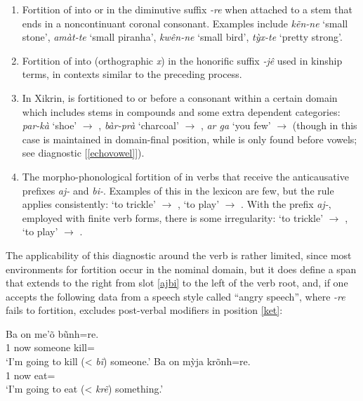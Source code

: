 \documentclass[output=paper]{langscibook}
\begin{document}
\begin{enumerate}
  \item\label{re} Fortition of  into  or  in the diminutive suffix {\em -re} when attached to a stem that ends in a noncontinuant coronal consonant. Examples include {\em kẽn-ne} `small stone', {\em amàt-te} `small piranha', {\em kwên-ne} `small bird', {\em tỳx-te} `pretty strong'. %
  \item\label{je} Fortition of  into  (orthographic {\em x}) in the honorific suffix {\em -jê} used in kinship terms, in contexts similar to the preceding process.
  \item In Xikrin,  is fortitioned to  or  before a consonant within a certain domain which includes stems in compounds and some extra dependent categories: {\em par-kà} `shoe' $\rightarrow$ \phofont{[patˈkʌ]}, {\em bàr-prà} `charcoal' $\rightarrow$ \phofont{[bʌtˈpɾʌ]}, {\em ar ga} `you few' $\rightarrow$ \phofont{[anˈga]} (though in this case \phofont{[an]} is maintained in domain-final position, while \phofont{[aɾ]} is only found before vowels; see diagnostic [\ref{echovowel}]).
  \item\label{bix} The morpho-phonological fortition of  in verbs that receive the anticausative prefixes {\em aj-} and {\em bi-}. Examples of this in the lexicon are few, but the rule applies consistently:  `to trickle' $\rightarrow$ \phofont{[bitʃaˈbjeɾe]},  `to play' $\rightarrow$ \phofont{[bitʃaˈeɾe]}. With the prefix {\em aj-}, employed with finite verb forms, there is some irregularity:  `to trickle' $\rightarrow$ \phofont{[atʃiˈbija]},  `to play' $\rightarrow$ \phofont{[aˈtʃe]}. %
\end{enumerate}

The applicability of this diagnostic around the verb is rather limited, since most environments for fortition occur in the nominal domain, but it does define a span that extends to the right from slot \ref{ajbi} to the left of the verb root, and, if one accepts the following data from a speech style called ``angry speech'', where {\em -re} fails to fortition, excludes post-verbal modifiers in position \ref{ket}:

\ea \ea\gll Ba on me'õ bũnh=re.\\
      1\Nom{} now someone kill=\Dim\\
    \glt `I'm going to kill (< {\em bĩ}) someone.'
  \ex\gll Ba on mỳja krõnh=re.\\
      1\Nom{} now eat=\Dim\\
    \glt `I'm going to eat (< {\em krẽ}) something.'
  \z
\z
\end{document}
